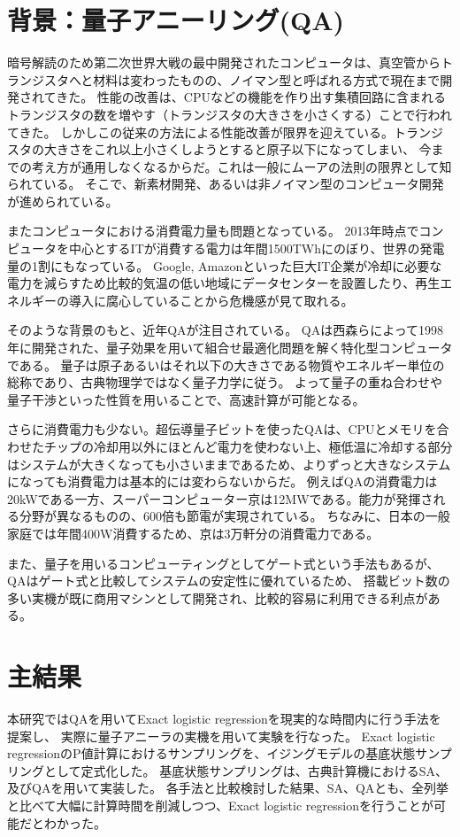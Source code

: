 \documentclass[12pt, dvipdfmx]{jmaster}
\theoremstyle{definition}
\begin{document}
\newpage
\section{背景：量子アニーリング(QA)}
暗号解読のため第二次世界大戦の最中開発されたコンピュータは、真空管からトランジスタへと材料は変わったものの、ノイマン型と呼ばれる方式で現在まで開発されてきた。
性能の改善は、CPUなどの機能を作り出す集積回路に含まれるトランジスタの数を増やす（トランジスタの大きさを小さくする）ことで行われてきた。
しかしこの従来の方法による性能改善が限界を迎えている。トランジスタの大きさをこれ以上小さくしようとすると原子以下になってしまい、
今までの考え方が通用しなくなるからだ。これは一般にムーアの法則の限界として知られている。
そこで、新素材開発、あるいは非ノイマン型のコンピュータ開発が進められている。

またコンピュータにおける消費電力量も問題となっている。
2013年時点でコンピュータを中心とするITが消費する電力は年間1500TWhにのぼり、世界の発電量の1割にもなっている。
Google, Amazonといった巨大IT企業が冷却に必要な電力を減らすため比較的気温の低い地域にデータセンターを設置したり、再生エネルギーの導入に腐心していることから危機感が見て取れる。

そのような背景のもと、近年QAが注目されている。
QAは西森らによって1998年に開発された、量子効果を用いて組合せ最適化問題を解く特化型コンピュータである\cite{kadowaki1998quantum}。
量子は原子あるいはそれ以下の大きさである物質やエネルギー単位の総称であり、古典物理学ではなく量子力学に従う。
よって量子の重ね合わせや量子干渉といった性質を用いることで、高速計算が可能となる。

さらに消費電力も少ない。超伝導量子ビットを使ったQAは、CPUとメモリを合わせたチップの冷却用以外にほとんど電力を使わない上、極低温に冷却する部分はシステムが大きくなっても小さいままであるため、よりずっと大きなシステムになっても消費電力は基本的には変わらないからだ。
例えばQAの消費電力は20kWである一方、スーパーコンピューター京は12MWである。能力が発揮される分野が異なるものの、600倍も節電が実現されている。
ちなみに、日本の一般家庭では年間400W消費するため、京は3万軒分の消費電力である。

また、量子を用いるコンピューティングとしてゲート式という手法もあるが、QAはゲート式と比較してシステムの安定性に優れているため、
搭載ビット数の多い実機が既に商用マシンとして開発され、比較的容易に利用できる利点がある\cite{nishimori}。


\section{主結果}
本研究ではQAを用いてExact logistic regressionを現実的な時間内に行う手法を提案し、
実際に量子アニーラの実機を用いて実験を行なった。
Exact logistic regressionのP値計算におけるサンプリングを、イジングモデルの基底状態サンプリングとして定式化した。
基底状態サンプリングは、古典計算機におけるSA、及びQAを用いて実装した。
各手法と比較検討した結果、SA、QAとも、全列挙と比べて大幅に計算時間を削減しつつ、Exact logistic regressionを行うことが可能だとわかった。
\end{document}
